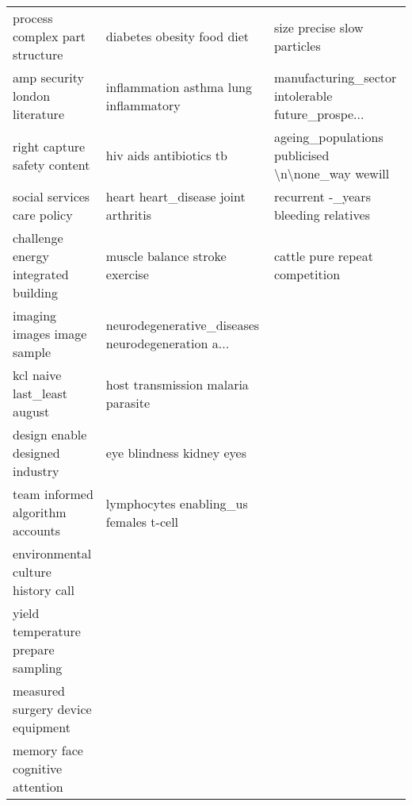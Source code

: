 \begin{tabular}{lll}
                    process complex part structure &                         diabetes obesity food diet &                        size precise slow particles \\
                    amp security london literature &              inflammation asthma lung inflammatory &  manufacturing\_sector intolerable future\_prospe... \\
                      right capture safety content &                            hiv aids antibiotics tb &   ageing\_populations publicised \textbackslash n\textbackslash none\_way wewill \\
                       social services care policy &                heart heart\_disease joint arthritis &               recurrent -\_years bleeding relatives \\
              challenge energy integrated building &                     muscle balance stroke exercise &                     cattle pure repeat competition \\
                       imaging images image sample &  neurodegenerative\_diseases neurodegeneration a... &                                                    \\
                       kcl naive last\_least august &                 host transmission malaria parasite &                                                    \\
                   design enable designed industry &                          eye blindness kidney eyes &                                                    \\
                  team informed algorithm accounts &             lymphocytes enabling\_us females t-cell &                                                    \\
                environmental culture history call &                                                    &                                                    \\
                yield temperature prepare sampling &                                                    &                                                    \\
                 measured surgery device equipment &                                                    &                                                    \\
                   memory face cognitive attention &                                                    &                                                    \\

\end{tabular}
